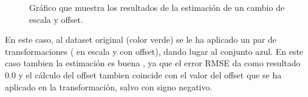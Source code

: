 \begin{figure}[H]
\begin{center}
\hspace{0.5cm}

\end{center}

\caption{Gráfico que muestra los resultados de la estimación de un cambio de escala y offset.}
\end{figure}

En este caso, al dataset original (color verde) se le ha aplicado un par de transformaciones ( en escala y con offset), dando lugar al conjunto azul. En este caso tambien la estimación es buena , ya que el error RMSE da como resultado 0.0 y el cálculo del offset tambien coincide con el valor del offset que se ha aplicado en la transformación, salvo con signo negativo.


